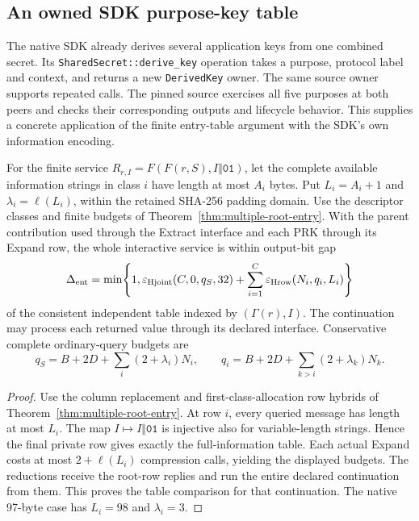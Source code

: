 \subsection{An owned SDK purpose-key table}
\label{sec:sdk-purpose-connection}

The native SDK already derives several application keys from one combined
secret. Its \texttt{SharedSecret::derive\_key} operation takes a purpose,
protocol label and context, and returns a new \texttt{DerivedKey} owner.
The same source owner supports repeated calls. The pinned source exercises
all five purposes at both peers and checks their corresponding outputs and
lifecycle behavior. This supplies a concrete application of the finite
entry-table argument with the SDK's own information encoding.

\begin{lemma}
\label{lem:entry-information-length}
For the finite service $R_{r,I}=F(F(r,S),I\Vert\mathtt{01})$, let the
complete available information strings in class $i$ have length at most
$A_i$ bytes. Put $L_i=A_i+1$ and $\lambda_i=\ell(L_i)$, within the retained
SHA-256 padding domain. Use the descriptor classes and finite budgets of
Theorem~\ref{thm:multiple-root-entry}. With the parent contribution used
through the Extract interface and each PRK through its Expand row, the
whole interactive service is within output-bit gap
\begin{equation}
 \Delta_{\rm ent}=\min\!\left\{1,
 \varepsilon_{\rm Hjoint}(C,0,q_S,32)
 +\sum_{i=1}^{C}\varepsilon_{\rm Hrow}(N_i,q_i,L_i)\right\}
 \label{eq:entry-information-length}
\end{equation}
of the consistent independent table indexed by $(\Gamma(r),I)$.
The continuation may process each returned value through its declared
interface. Conservative complete ordinary-query budgets are
\[
 q_S=B+2D+\sum_i(2+\lambda_i)N_i,\qquad
 q_i=B+2D+\sum_{k>i}(2+\lambda_k)N_k.
\]
\end{lemma}
\begin{proof}
Use the column replacement and first-class-allocation row hybrids of
Theorem~\ref{thm:multiple-root-entry}. At row $i$, every queried message
has length at most $L_i$. The map $I\mapsto I\Vert\mathtt{01}$ is injective
also for variable-length strings. Hence the final private row gives exactly
the full-information table. Each actual Expand costs at most
$2+\ell(L_i)$ compression calls, yielding the displayed budgets.
The reductions receive the root-row replies and run the entire declared
continuation from them. This proves the table comparison for that
continuation. The native 97-byte case has $L_i=98$ and $\lambda_i=3$.
\end{proof}

